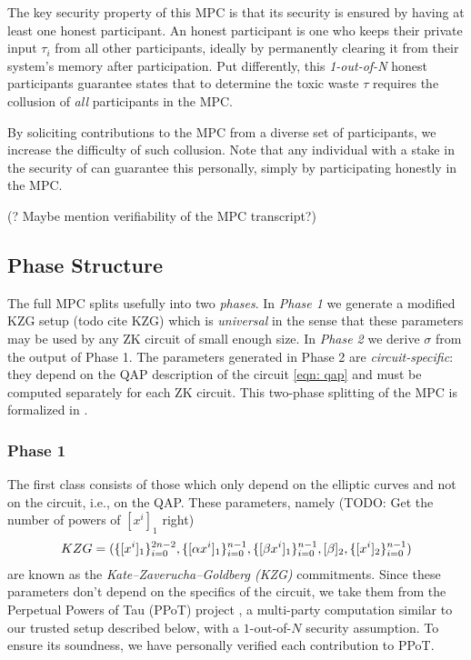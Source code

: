 The key security property of this MPC is that its security is ensured by having at least one honest participant. An honest participant is one who keeps their private input $\tau_i$ from all other participants, ideally by permanently clearing it from their system's memory after participation. Put differently, this \emph{1-out-of-N} honest participants guarantee states that to determine the toxic waste $\tau$ requires the collusion of \emph{all} participants in the MPC. 

By soliciting contributions to the MPC from a diverse set of participants, we increase the difficulty of such collusion. Note that any individual with a stake in the security of \MantaPay{} can guarantee this personally, simply by participating honestly in the \Setup{} MPC.

(? Maybe mention verifiability of the MPC transcript?)

\subsection{Phase Structure}

The full \Setup{} MPC splits usefully into two \emph{phases}. In \emph{Phase 1} we generate a modified KZG setup (todo cite KZG) which is \emph{universal} in the sense that these parameters may be used by any ZK circuit of small enough size. In \emph{Phase 2} we derive $\sigma$ from the output of Phase 1. The parameters generated in Phase 2 are \emph{circuit-specific}: they depend on the QAP description of the circuit \eqref{eqn: qap} and must be computed separately for each ZK circuit. This two-phase splitting of the MPC is formalized in \cite{bowe19}.

\subsubsection{Phase 1}

The first class consists of those which only depend on the elliptic curves and not on the circuit, i.e., on the QAP. These parameters, namely (TODO: Get the number of powers of $[x^i]_1$ right)
\begin{align}\label{eq: kzg}
KZG = ( \{ [x^i]_1 \}_{i=0}^{2n-2}, \{ [\alpha x^i]_1 \}_{i=0}^{n-1}, \{ [\beta x^i]_1 \}_{i=0}^{n-1}, [\beta]_2, \{ [x^i]_2 \}_{i=0}^{n-1} ){}
\end{align}
are known as the \emph{Kate--Zaverucha--Goldberg (KZG)} commitments. Since these parameters don't depend on the specifics of the circuit, we take them from the Perpetual Powers of Tau (PPoT) project \cite{PPoT}, a multi-party computation similar to our trusted setup described below, with a $1$-out-of-$N$ security assumption. To ensure its soundness, we have personally verified each contribution to PPoT.

